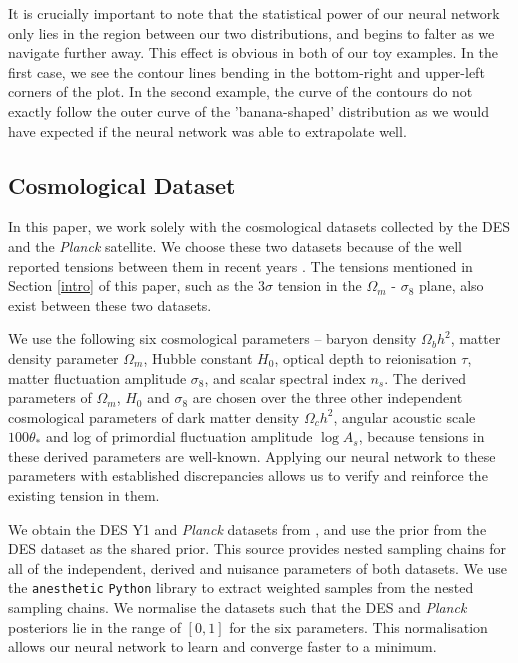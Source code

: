 \documentclass[%
 reprint,
 amsmath,amssymb,
 aps,
]{revtex4-2}
\begin{document}
It is crucially important to note that the statistical power of our neural network only lies in the region between our two distributions, and begins to falter as we navigate further away. This effect is obvious in both of our toy examples. In the first case, we see the contour lines bending in the bottom-right and upper-left corners of the plot. In the second example, the curve of the contours do not exactly follow the outer curve of the 'banana-shaped' distribution as we would have expected if the neural network was able to extrapolate well.


\subsection{Cosmological Dataset}

In this paper, we work solely with the cosmological datasets collected by the DES and the \textit{Planck} satellite. We choose these two datasets because of the well reported tensions between them in recent years \cite{Handley2019, Lemos2020}. The tensions mentioned in Section \ref{intro} of this paper, such as the $3\sigma$ tension in the $\Omega_m$ - $\sigma_8$ plane, also exist between these two datasets.

We use the following six cosmological parameters -- baryon density $\Omega_b h^2$, matter density parameter $\Omega_m$, Hubble constant $H_0$, optical depth to reionisation $\tau$, matter fluctuation amplitude $\sigma_8$, and scalar spectral index $n_s$. The derived parameters of $\Omega_m$, $H_0$ and $\sigma_8$ are chosen over the three other independent cosmological parameters of dark matter density $\Omega_c h^2$, angular acoustic scale $100 \theta_*$ and log of primordial fluctuation amplitude $\log A_s$,  because tensions in these derived parameters are well-known. Applying our neural network to these parameters with established discrepancies allows us to verify and reinforce the existing tension in them.

We obtain the DES Y1 and \textit{Planck} datasets from \cite{Dataset}, and use the prior from the DES dataset as the shared prior. This source provides nested sampling chains for all of the independent, derived and nuisance parameters of both datasets. We use the \texttt{anesthetic} \texttt{Python} library \cite{anesthetic} to extract weighted samples from the nested sampling chains. We normalise the datasets such that the DES and \textit{Planck} posteriors lie in the range of $[0, 1]$ for the six parameters. This normalisation allows our neural network to learn and converge faster to a minimum.
\end{document}
